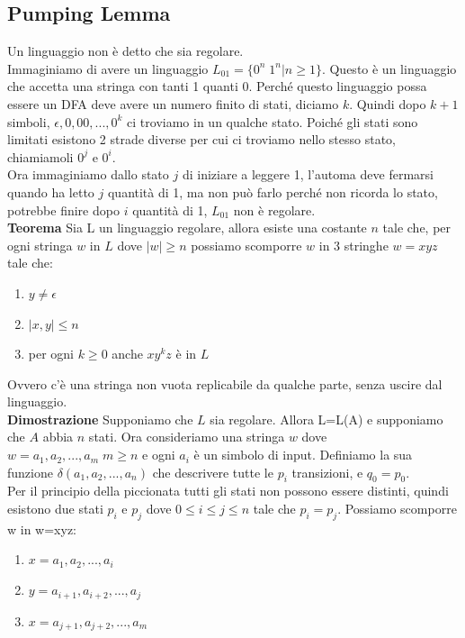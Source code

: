 \documentclass[12pt]{article}
\begin{document}
	\subsection{Pumping Lemma}
	Un linguaggio non è detto che sia regolare.
	\\ Immaginiamo di avere un linguaggio $L_{01}=\{0^n\;1^n|n\geq 1\}$. Questo è un linguaggio che accetta una stringa con tanti 1 quanti 0. Perché questo linguaggio possa essere un DFA deve avere un numero finito di stati, diciamo $k$. Quindi dopo $k+1$ simboli, $\epsilon,0,00,...,0^k$ ci troviamo in un qualche stato. Poiché gli stati sono limitati esistono 2 strade diverse per cui ci troviamo nello stesso stato, chiamiamoli $0^j$ e $0^i$.
	\\ Ora immaginiamo dallo stato $j$ di iniziare a leggere 1, l'automa deve fermarsi quando ha letto $j$ quantità di 1, ma non può farlo perché non ricorda lo stato, potrebbe finire dopo $i$ quantità di 1, $L_{01}$ non è regolare.
	\\ \textbf{Teorema} Sia L un linguaggio regolare, allora esiste una costante $n$ tale che, per ogni stringa $w$ in $L$ dove $|w|\geq n$ possiamo scomporre $w$ in 3 stringhe $w=xyz$ tale che:
	\begin{enumerate}
		\item $y \neq \epsilon$
		\item $|x,y| \leq n$
		\item per ogni $k \geq 0$ anche $xy^kz$ è in $L$
	\end{enumerate}
	Ovvero c'è una stringa non vuota replicabile da qualche parte, senza uscire dal linguaggio.
	\\ \textbf{Dimostrazione} Supponiamo che $L$ sia regolare. Allora L=L(A) e supponiamo che $A$ abbia $n$ stati. Ora consideriamo una stringa $w$ dove $w=a_1,a_2,...,a_m \; m \geq n$ e ogni $a_i$ è un simbolo di input. Definiamo la sua funzione $\delta(a_1,a_2,...,a_n)$ che descrivere tutte le $p_i$ transizioni, e $q_0=p_0$.
	\\ Per il principio della piccionata tutti gli stati non possono essere distinti, quindi esistono due stati $p_i$ e $p_j$ dove $0 \leq i \leq j \leq n$ tale che $p_i = p_j$. Possiamo scomporre w in w=xyz:

	\begin{enumerate}
		\item $x=a_1,a_2,...,a_i$
		\item $y=a_{i+1},a_{i+2},...,a_j$
		\item $x=a_{j+1},a_{j+2},...,a_m$
	\end{enumerate}
\end{document}
